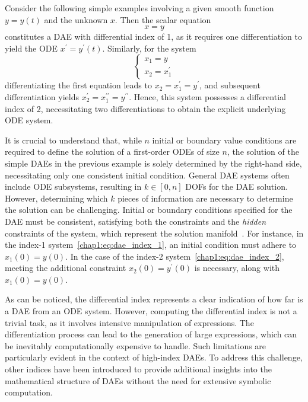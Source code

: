 \begin{example}
  Consider the following simple examples involving a given smooth function $y = y(t)$ and the unknown $x$. Then the scalar equation
  \begin{equation}
    x = y
    \label{chap1:eq:dae_index_1}
  \end{equation}
  constitutes a \ac{DAE} with differential index of 1, as it requires one differentiation to yield the \ac{ODE} $x^{\prime} = y^{\prime}(t)$. Similarly, for the system
  \begin{equation}
    \begin{cases}
      x_1 = y \\
      x_2 = x_1^{\prime}
    \end{cases}
    \label{chap1:eq:dae_index_2}
  \end{equation}
  differentiating the first equation leads to $x_2 = x_1^{\prime} = y^{\prime}$, and subsequent differentiation yields $x_2^{\prime} = x_1^{\prime\prime} = y^{\prime\prime}$. Hence, this system possesses a differential index of 2, necessitating two differentiations to obtain the explicit underlying \ac{ODE} system.
\end{example}

It is crucial to understand that, while $n$ initial or boundary value conditions are required to define the solution of a first-order \acp{ODE} of size $n$, the solution of the simple \acp{DAE} in the previous example is solely determined by the right-hand side, necessitating only one consistent initial condition. General \ac{DAE} systems often include \ac{ODE} subsystems, resulting in $k \in [0, n]$ \acp{DOF} for the \ac{DAE} solution. However, determining which $k$ pieces of information are necessary to determine the solution can be challenging. Initial or boundary conditions specified for the \ac{DAE} must be consistent, satisfying both the constraints and the \emph{hidden} constraints of the system, which represent the solution manifold~\cite{rheinboldt1984differential}. For instance, in the index-1 system~\eqref{chap1:eq:dae_index_1}, an initial condition must adhere to $x_1(0) = y(0)$. In the case of the index-2 system~\eqref{chap1:eq:dae_index_2}, meeting the additional constraint $x_2(0) = y^{\prime}(0)$ is necessary, along with $x_1(0) = y(0)$.

As can be noticed, the differential index represents a clear indication of how far is a \ac{DAE} from an \ac{ODE} system. However, computing the differential index is not a trivial task, as it involves intensive manipulation of expressions. The differentiation process can lead to the generation of large expressions, which can be inevitably computationally expensive to handle. Such limitations are particularly evident in the context of high-index \acp{DAE}. To address this challenge, other indices have been introduced to provide additional insights into the mathematical structure of \acp{DAE} without the need for extensive symbolic computation.


